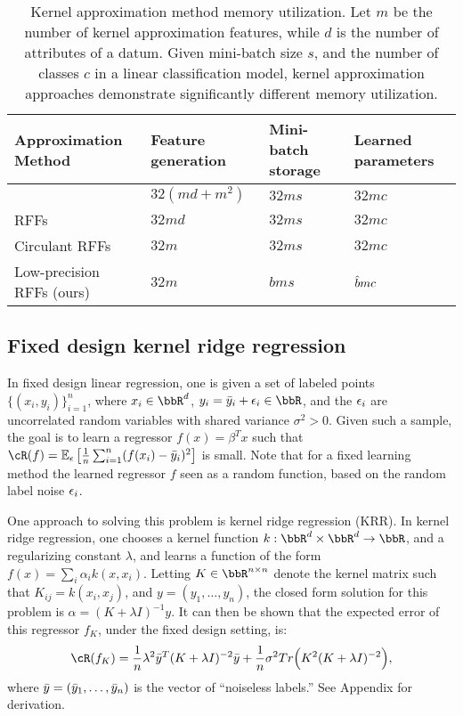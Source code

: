 \begin{table}
	\caption{Kernel approximation method memory utilization. Let $m$ be the number of kernel approximation features, while $d$ is the number of attributes of a datum. Given mini-batch size $s$, and the number of classes $c$ in a linear classification model, kernel approximation approaches demonstrate significantly different memory utilization.}
	\label{table:mem-usage}
	\centering
	\begin{tabular}{llll}
		\toprule
		Approximation Method & Feature generation & Mini-batch storage & Learned parameters \\
		\midrule
		\Nystrom \citep{nystrom} & $32(md + m^2)$ & $32ms$ & $32mc$ \\
		RFFs \citep{rahimi07random} &  $32md$ & $32ms$ & $32mc$ \\
		Circulant RFFs \citep{yu15} & $32m$ & $32ms$ & $32mc$ \\
		Low-precision RFFs (ours)& $32m$ & $bms$ & $\hat{b} mc$ \\
		\bottomrule
	\end{tabular}
\end{table}

\subsection{Fixed design kernel ridge regression}
In fixed design linear regression, one is given a set of labeled points $\{(x_i,y_i)\}_{i=1}^n$, where $x_i \in \RR^d$, $y_i = \by_i + \eps_i \in \RR$, and the $\epsilon_i$ are uncorrelated random variables with shared variance $\sigma^2 > 0$.  Given such a sample, the goal is to learn a regressor $f(x) = \beta^T x$ such that $\cR(f) = \expect{\eps}{\frac{1}{n}\sum_{i=1}^n (f(x_i) - \by_i)^2}$ is small. Note that for a fixed learning method the learned regressor $f$ seen as a random function, based on the random label noise $\epsilon_i$.

One approach to solving this problem is kernel ridge regression (KRR).  In kernel ridge regression, one chooses a kernel function $k:\RR^d\times\RR^d\rightarrow \RR$, and a regularizing constant $\lambda$, and learns a function of the form $f(x) = \sum_i \alpha_i k(x,x_i)$.  Letting $K\in\RR^{n\times n}$ denote the kernel matrix such that $K_{ij} = k(x_i,x_j)$, and $y = (y_1,\ldots,y_n)$, the closed form solution for this problem is $\alpha = (K+\lambda I)^{-1}y$. It can then be shown that the expected error of this regressor $f_K$, under the fixed design setting, is:
\begin{eqnarray}
\cR(f_K) = \frac{1}{n}\lambda^2 \by^T(K+\lambda I)^{-2}\by + \frac{1}{n}\sigma^2 Tr\Big(K^2(K+\lambda \id)^{-2}\Big),
\end{eqnarray}
where $\bar{y} = (\bar{y}_1,\ldots,\bar{y}_n)$ is the vector of ``noiseless labels.'' See Appendix  for derivation.

